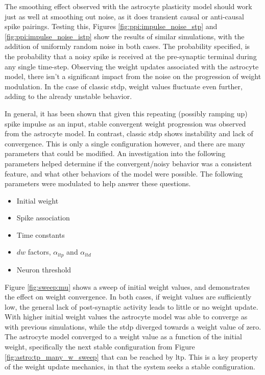 The smoothing effect observed with the astrocyte plasticity model should work
just as well at smoothing out noise, as it does transient causal or anti-causal
spike pairings. Testing this, Figures \ref{fig:ppi:impulse_noise_stp} and
\ref{fig:ppi:impulse_noise_istp} show the results of similar simulations, with
the addition of uniformly random noise in both cases. The probability specified,
is the probability that a noisy spike is received at the pre-synaptic
terminal during any single time-step. Observing the weight updates associated
with the astrocyte model, there isn't a significant impact from the noise on the
progression of weight modulation. In the case of classic \gls{stdp}, weight values
fluctuate even further, adding to the already unstable behavior.



In general, it has been shown that given this repeating (possibly ramping up)
spike impulse as an input, stable convergent weight progression was observed
from the astrocyte model. In contrast, classic \gls{stdp} shows instability and
lack of convergence. This is only a single configuration however, and there are
many parameters that could be modified. An investigation into the following
parameters helped determine if the convergent/noisy behavior was a consistent
feature, and what other behaviors of the model were possible. The following
parameters were modulated to help answer these questions.

\begin{itemize}
\item Initial weight
\item Spike association
\item Time constants
\item $dw$ factors, $\alpha_{ltp}$ and $\alpha_{ltd}$
\item Neuron threshold
\end{itemize}

Figure \ref{fig:sweep:mu} shows a sweep of initial weight values, and
demonstrates the effect on weight convergence. In both cases, if weight values
are sufficiently low, the general lack of post-synaptic activity leads to little
or no weight update. With higher initial weight values the astrocyte model was
able to converge as with previous simulations, while the \gls{stdp} diverged towards a
weight value of zero. The astrocyte model converged to a weight value as a
function of the initial weight, specifically the next stable configuration from
Figure \ref{fig:astro:tp_many_w_sweep} that can be reached by \gls{ltp}. This is a key
property of the weight update mechanics, in that the system seeks a stable
configuration.

